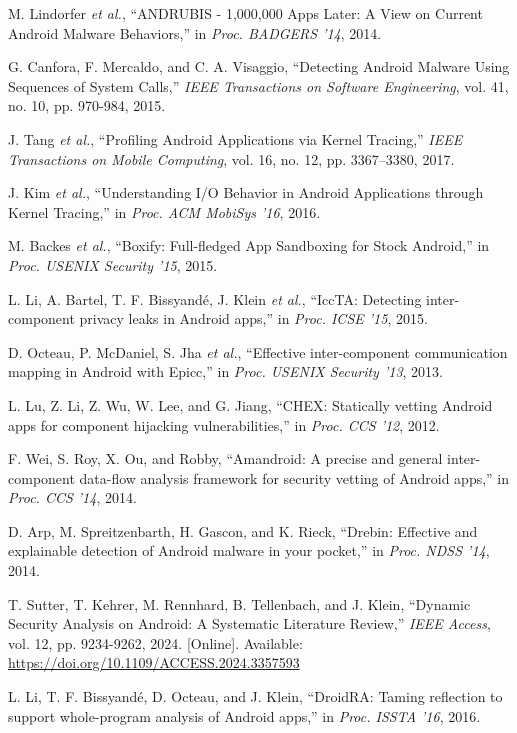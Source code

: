 \documentclass[a4paper,12pt]{report}
\begin{document}
\begin{thebibliography}{99}
M. Lindorfer \emph{et al.}, “ANDRUBIS - 1,000,000 Apps Later: A View on Current Android Malware Behaviors,” in \emph{Proc. BADGERS '14}, 2014.

G. Canfora, F. Mercaldo, and C. A. Visaggio, “Detecting Android Malware Using Sequences of System Calls,” \emph{IEEE Transactions on Software Engineering}, vol. 41, no. 10, pp. 970-984, 2015.

J. Tang \emph{et al.}, “Profiling Android Applications via Kernel Tracing,” \emph{IEEE Transactions on Mobile Computing}, vol. 16, no. 12, pp. 3367–3380, 2017.

J. Kim \emph{et al.}, “Understanding I/O Behavior in Android Applications through Kernel Tracing,” in \emph{Proc. ACM MobiSys '16}, 2016.

M. Backes \emph{et al.}, “Boxify: Full-fledged App Sandboxing for Stock Android,” in \emph{Proc. USENIX Security '15}, 2015.

L. Li, A. Bartel, T. F. Bissyandé, J. Klein \emph{et al.}, “IccTA: Detecting inter-component privacy leaks in Android apps,” in \emph{Proc. ICSE ’15}, 2015.

D. Octeau, P. McDaniel, S. Jha \emph{et al.}, “Effective inter-component communication mapping in Android with Epicc,” in \emph{Proc. USENIX Security '13}, 2013.

L. Lu, Z. Li, Z. Wu, W. Lee, and G. Jiang, “CHEX: Statically vetting Android apps for component hijacking vulnerabilities,” in \emph{Proc. CCS '12}, 2012.

F. Wei, S. Roy, X. Ou, and Robby, “Amandroid: A precise and general inter-component data-flow analysis framework for security vetting of Android apps,” in \emph{Proc. CCS '14}, 2014.

D. Arp, M. Spreitzenbarth, H. Gascon, and K. Rieck, “Drebin: Effective and explainable detection of Android malware in your pocket,” in \emph{Proc. NDSS '14}, 2014.

T. Sutter, T. Kehrer, M. Rennhard, B. Tellenbach, and J. Klein, “Dynamic Security Analysis on Android: A Systematic Literature Review,” \emph{IEEE Access}, vol. 12, pp. 9234-9262, 2024. [Online]. Available: \url{https://doi.org/10.1109/ACCESS.2024.3357593}

L. Li, T. F. Bissyandé, D. Octeau, and J. Klein, “DroidRA: Taming reflection to support whole-program analysis of Android apps,” in \emph{Proc. ISSTA '16}, 2016.


\end{thebibliography}
\end{document}
